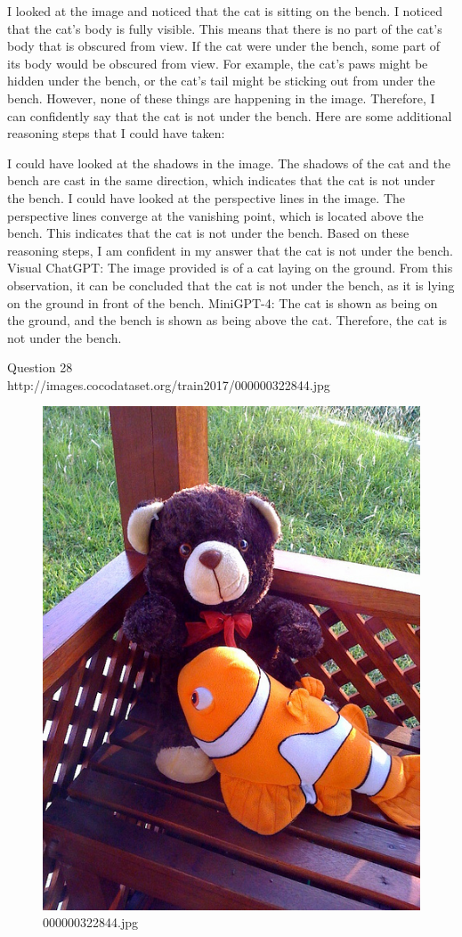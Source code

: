 \begin{enumerate}
        I looked at the image and noticed that the cat is sitting on the bench.
        I noticed that the cat's body is fully visible. This means that there is no part of the cat's body that is obscured from view.
        If the cat were under the bench, some part of its body would be obscured from view. For example, the cat's paws might be hidden under the bench, or the cat's tail might be sticking out from under the bench. However, none of these things are happening in the image.
        Therefore, I can confidently say that the cat is not under the bench.
        Here are some additional reasoning steps that I could have taken:
        
        I could have looked at the shadows in the image. The shadows of the cat and the bench are cast in the same direction, which indicates that the cat is not under the bench.
        I could have looked at the perspective lines in the image. The perspective lines converge at the vanishing point, which is located above the bench. This indicates that the cat is not under the bench.
        Based on these reasoning steps, I am confident in my answer that the cat is not under the bench.
        \subitem Visual ChatGPT: The image provided is of a cat laying on the ground. From this observation, it can be concluded that the cat is not under the bench, as it is lying on the ground in front of the bench.
        \subitem MiniGPT-4: The cat is shown as being on the ground, and the bench is shown as being above the cat. Therefore, the cat is not under the bench.
    \end{enumerate}
Question 28\\
    http://images.cocodataset.org/train2017/000000322844.jpg
    \begin{figure}[h]
        \centering
        \includegraphics[width=0.8\linewidth]{../image set/easy/000000322844.jpg}
        \caption{000000322844.jpg}
    \end{figure}
